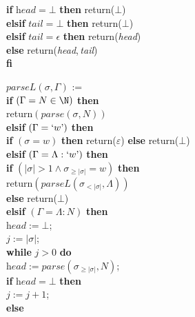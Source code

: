 \documentclass[adraft]{eptcs}
\begin{document}
\begin{minipage}{3in}
\quad \quad  \textbf{if} $\textit{head}=\bot$ \textbf{then} return($\bot$) \\ \mbox{}
\quad \quad  \textbf{elsif} $\textit{tail}=\bot$ \textbf{then} return($\bot$) \\ \mbox{}
\quad \quad  \textbf{elsif} $\textit{tail}=\epsilon$ \textbf{then} return(\textit{head}) \\ \mbox{}
\quad \quad  \textbf{else} return(\textit{head},\,\textit{tail}) \\ \mbox{}
\quad \textbf{fi} \\ \mbox{}
\end{minipage}
\hfill
\begin{minipage}{3in}
$\textit{parseL}(\sigma,\Gamma)$ :=\\ \mbox{}
\quad \textbf{if} $(\Gamma=N\in\N)$ \textbf{then} \\ \mbox{}
\quad \quad return$(\textit{parse}(\sigma,N))$ \\ \mbox{}
\quad \textbf{elsif} $(\Gamma=`w\mbox{'})$ \textbf{then} \\ \mbox{}
\quad \quad \textbf{if} $(\sigma = w)$ \textbf{then} return($\varepsilon$) \textbf{else} return($\bot$) \\ \mbox{}
\quad \textbf{elsif} $(\Gamma= \Lambda : `w\mbox{'})$ \textbf{then} \\ \mbox{}
\quad \quad \textbf{if} $(|\sigma| > 1 \wedge \sigma_{\geq |\sigma|} = w)$ \textbf{then} \\ \mbox{}
\quad \quad \quad return$(\textit{parseL}(\sigma_{< |\sigma|},\Lambda))$ \\ \mbox{}
\quad \quad \textbf{else} return($\bot$) \\ \mbox{}
\quad \textbf{elsif} $(\Gamma= \Lambda : N)$ \textbf{then} \\ \mbox{}
\quad \quad  $\textit{head} := \bot$; \\ \mbox{}
\quad \quad  $j:=|\sigma|$; \\ \mbox{}
\quad \quad  \textbf{while} $j > 0$ \textbf{do} \\ \mbox{}
\quad \quad \quad $\textit{head} := \textit{parse}(\sigma_{\geq |\sigma|},N)$; \\ \mbox{}
\quad \quad \quad  \textbf{if} $\textit{head}=\bot$ \textbf{then} \\ \mbox{}
\quad \quad \quad \quad $j:=j+1$; \\ \mbox{}
\quad \quad \quad  \textbf{else}  \\ \mbox{}

\end{minipage}
\end{document}
